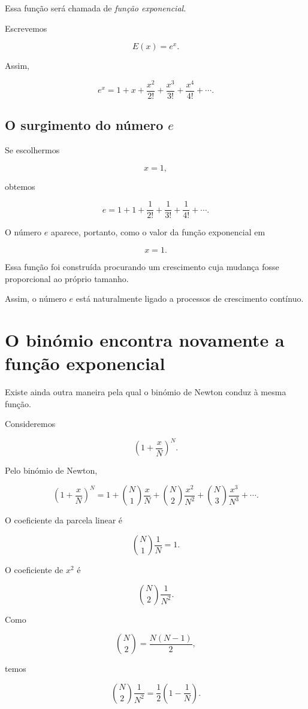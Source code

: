 \documentclass[12pt,a4paper]{article}
\begin{document}
Essa função será chamada de \emph{função exponencial}.

Escrevemos

\[
E(x)=e^x.
\]

Assim,

\[
e^x
=
1+x+\frac{x^2}{2!}
+\frac{x^3}{3!}
+\frac{x^4}{4!}
+\cdots.
\]

\subsection{O surgimento do número \(e\)}

Se escolhermos

\[
x=1,
\]

obtemos

\[
e
=
1+1+\frac{1}{2!}
+\frac{1}{3!}
+\frac{1}{4!}
+\cdots.
\]

O número \(e\) aparece, portanto, como o valor da função exponencial em

\[
x=1.
\]

Essa função foi construída procurando um crescimento cuja mudança fosse
proporcional ao próprio tamanho.

Assim, o número \(e\) está naturalmente ligado a processos de
crescimento contínuo.

\section{O binómio encontra novamente a função exponencial}

Existe ainda outra maneira pela qual o binómio de Newton conduz à mesma
função.

Consideremos

\[
\left(1+\frac{x}{N}\right)^N.
\]

Pelo binómio de Newton,

\[
\left(1+\frac{x}{N}\right)^N
=
1
+
\binom{N}{1}\frac{x}{N}
+
\binom{N}{2}\frac{x^2}{N^2}
+
\binom{N}{3}\frac{x^3}{N^3}
+\cdots.
\]

O coeficiente da parcela linear é

\[
\binom{N}{1}\frac{1}{N}
=
1.
\]

O coeficiente de \(x^2\) é

\[
\binom{N}{2}\frac{1}{N^2}.
\]

Como

\[
\binom{N}{2}
=
\frac{N(N-1)}{2},
\]

temos

\[
\binom{N}{2}\frac{1}{N^2}
=
\frac12
\left(
1-\frac1N
\right).
\]
\end{document}
